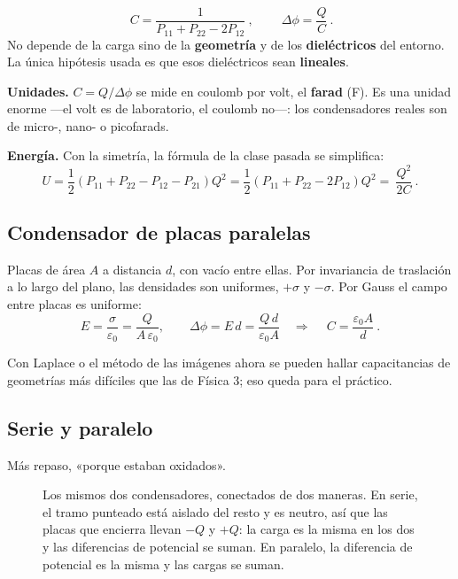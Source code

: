 \documentclass[12pt,a4paper]{article}
\begin{document}
\begin{keybox}[Capacitancia]
\[
\boxed{\ C = \frac{1}{P_{11}+P_{22}-2P_{12}}\ },
\qquad
\boxed{\ \Delta\phi = \frac{Q}{C}\ } .
\]
No depende de la carga sino de la \textbf{geometría} y de los
\textbf{dieléctricos} del entorno. La única hipótesis usada es que esos
dieléctricos sean \textbf{lineales}.
\end{keybox}

\textbf{Unidades.} $C = Q/\Delta\phi$ se mide en coulomb por volt, el
\textbf{farad} (F). Es una unidad enorme ---el volt es de laboratorio, el coulomb
no---: los condensadores reales son de micro-, nano- o picofarads.

\textbf{Energía.} Con la simetría, la fórmula de la clase pasada se simplifica:
\[
U = \frac12\left(P_{11}+P_{22}-P_{12}-P_{21}\right)Q^2
= \frac12\left(P_{11}+P_{22}-2P_{12}\right)Q^2
= \boxed{\ \frac{Q^2}{2C}\ } .
\]

\subsection{Condensador de placas paralelas}

Placas de área $A$ a distancia $d$, con vacío entre ellas. Por invariancia de
traslación a lo largo del plano, las densidades son uniformes, $+\sigma$ y
$-\sigma$. Por Gauss el campo entre placas es uniforme:
\[
E = \frac{\sigma}{\varepsilon_0} = \frac{Q}{A\,\varepsilon_0},
\qquad
\Delta\phi = E\,d = \frac{Q\,d}{\varepsilon_0 A}
\quad\Longrightarrow\quad
\boxed{\ C = \frac{\varepsilon_0 A}{d}\ } .
\]

\begin{notebox}
Con Laplace o el método de las imágenes ahora se pueden hallar capacitancias de
geometrías más difíciles que las de Física 3; eso queda para el práctico.
\end{notebox}

\subsection{Serie y paralelo}

Más repaso, «porque estaban oxidados».

\begin{figure}[H]
  \centering
  
  \caption{Los mismos dos condensadores, conectados de dos maneras. En serie, el
  tramo punteado está aislado del resto y es neutro, así que las placas que
  encierra llevan $-Q$ y $+Q$: la carga es la misma en los dos y las diferencias
  de potencial se suman. En paralelo, la diferencia de potencial es la misma y
  las cargas se suman.}
\end{figure}
\end{document}
